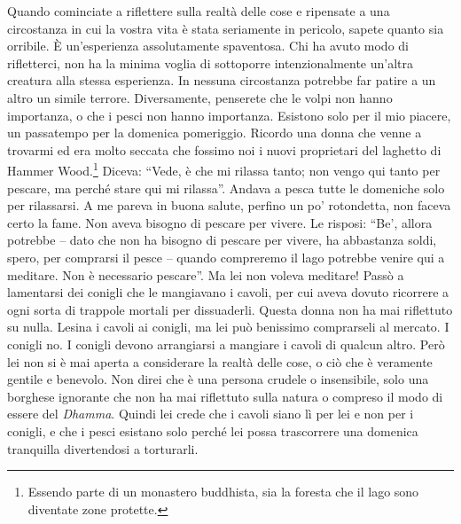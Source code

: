 Quando cominciate a riflettere sulla realtà delle cose e ripensate a una
circostanza in cui la vostra vita è stata seriamente in pericolo, sapete
quanto sia orribile. È un'esperienza assolutamente spaventosa. Chi ha
avuto modo di rifletterci, non ha la minima voglia di sottoporre
intenzionalmente un'altra creatura alla stessa esperienza. In nessuna
circostanza potrebbe far patire a un altro un simile terrore.
Diversamente, penserete che le volpi non hanno importanza, o che i pesci
non hanno importanza. Esistono solo per il mio piacere, un passatempo
per la domenica pomeriggio. Ricordo una donna che venne a trovarmi ed
era molto seccata che fossimo noi i nuovi proprietari del laghetto di
Hammer Wood.\footnote{Essendo parte di un monastero buddhista, sia la foresta
che il lago sono diventate zone protette.} Diceva: ``Vede, è che mi rilassa tanto; non
vengo qui tanto per pescare, ma perché stare qui mi rilassa''. Andava a
pesca tutte le domeniche solo per rilassarsi. A me pareva in buona
salute, perfino un po' rotondetta, non faceva certo la fame. Non aveva
bisogno di pescare per vivere. Le risposi: ``Be', allora potrebbe – dato
che non ha bisogno di pescare per vivere, ha abbastanza soldi, spero,
per comprarsi il pesce – quando compreremo il lago potrebbe venire qui a
meditare. Non è necessario pescare''. Ma lei non voleva meditare! Passò a
lamentarsi dei conigli che le mangiavano i cavoli, per cui aveva dovuto
ricorrere a ogni sorta di trappole mortali per dissuaderli. Questa donna
non ha mai riflettuto su nulla. Lesina i cavoli ai conigli, ma lei può
benissimo comprarseli al mercato. I conigli no. I conigli devono
arrangiarsi a mangiare i cavoli di qualcun altro. Però lei non si è mai
aperta a considerare la realtà delle cose, o ciò che è veramente gentile
e benevolo. Non direi che è una persona crudele o insensibile, solo una
borghese ignorante che non ha mai riflettuto sulla natura o compreso il
modo di essere del \textit{Dhamma}. Quindi lei crede che i cavoli siano lì per
lei e non per i conigli, e che i pesci esistano solo perché lei possa
trascorrere una domenica tranquilla divertendosi a torturarli.

